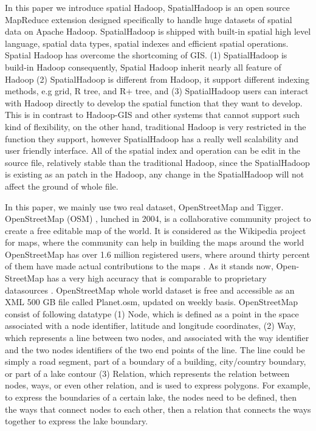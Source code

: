 In this paper we introduce spatial Hadoop, SpatialHadoop is an open source MapReduce extension designed specifically to handle huge datasets of spatial data on Apache Hadoop. SpatialHadoop is shipped with built-in spatial high level language, spatial data types, spatial indexes and efficient spatial operations. Spatial Hadoop has overcome the shortcoming of GIS. (1) \cite{eldawy2015spatialhadoop} SpatialHadoop is build-in Hadoop consequently, Spatial Hadoop inherit nearly all feature of Hadoop (2) SpatialHadoop is different from Hadoop, it support different indexing methods, e.g grid, R tree, and R+ tree, and (3) SpatialHadoop users can interact with Hadoop directly to develop the spatial function that they want to develop. This is in contrast to Hadoop-GIS and other systems that cannot support such kind of flexibility, on the other hand, traditional Hadoop is very restricted in the function they support, however SpatialHadoop has a really well scalability and user friendly interface. All of the spatial index and operation can be edit in the source file, relatively stable than the traditional Hadoop, since the SpatialHadoop is existing as an patch in the Hadoop, any change in the SpatialHadoop will not affect the ground of whole file. 

In this paper, we mainly use two real dataset, OpenStreetMap and Tigger. OpenStreetMap (OSM) \cite{alarabi2014tareeg}, lunched in 2004, is a collaborative community project to create a free editable map of the world. It is considered as the Wikipedia project for maps, where the community can help in building the maps around the world OpenStreetMap has over 1.6 million registered users, where around thirty percent of them have made actual contributions to the maps . As it stands now, Open-StreetMap has a very high accuracy that is comparable to proprietary datasources . OpenStreetMap whole world dataset is free and accessible as an XML 500 GB file called Planet.osm, updated on weekly basis. OpenStreetMap consist of following datatype (1) Node, which is defined as a point in the space associated with a node identifier, latitude and longitude coordinates,
(2) Way, which represents a line between two nodes, and associated with the way identifier and the two nodes identifiers of the two end points of the line. The line could be simply a road segment, part of a boundary of a building, city/country boundary, or part of a lake contour (3) Relation, which represents the relation between nodes, ways, or even other relation, and is used to express polygons. For example, to express the boundaries of a certain lake, the nodes need to be defined, then the ways that connect nodes to each other, then a relation that connects the ways together to express the lake boundary.

